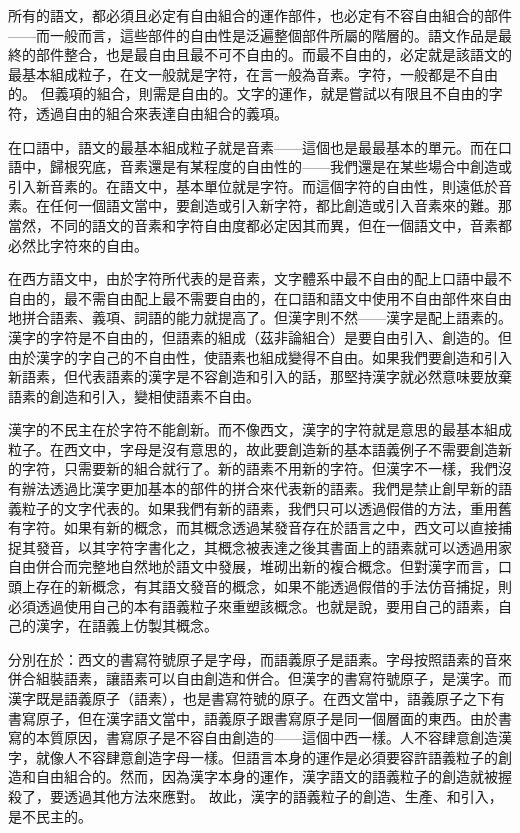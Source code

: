 \documentclass[a5paper, 12pt, openany]{book} %
\begin{document}
所有的語文，都必須且必定有自由組合的運作部件，也必定有不容自由組合的部件——而一般而言，這些部件的自由性是泛遍整個部件所屬的階層的。語文作品是最終的部件整合，也是最自由且最不可不自由的。而最不自由的，必定就是該語文的最基本組成粒子，在文一般就是字符，在言一般為音素。字符，一般都是不自由的。 但義項的組合，則需是自由的。文字的運作，就是嘗試以有限且不自由的字符，透過自由的組合來表達自由組合的義項。

在口語中，語文的最基本組成粒子就是音素——這個也是最最基本的單元。而在口語中，歸根究底，音素還是有某程度的自由性的——我們還是在某些場合中創造或引入新音素的。在語文中，基本單位就是字符。而這個字符的自由性，則遠低於音素。在任何一個語文當中，要創造或引入新字符，都比創造或引入音素來的難。那當然，不同的語文的音素和字符自由度都必定因其而異，但在一個語文中，音素都必然比字符來的自由。

在西方語文中，由於字符所代表的是音素，文字體系中最不自由的配上口語中最不自由的，最不需自由配上最不需要自由的，在口語和語文中使用不自由部件來自由地拼合語素、義項、詞語的能力就提高了。但漢字則不然——漢字是配上語素的。漢字的字符是不自由的，但語素的組成（茲非論組合）是要自由引入、創造的。但由於漢字的字自己的不自由性，使語素也組成變得不自由。如果我們要創造和引入新語素，但代表語素的漢字是不容創造和引入的話，那堅持漢字就必然意味要放棄語素的創造和引入，變相使語素不自由。

漢字的不民主在於字符不能創新。而不像西文，漢字的字符就是意思的最基本組成粒子。在西文中，字母是沒有意思的，故此要創造新的基本語義例子不需要創造新的字符，只需要新的組合就行了。新的語素不用新的字符。但漢字不一樣，我們沒有辦法透過比漢字更加基本的部件的拼合來代表新的語素。我們是禁止創早新的語義粒子的文字代表的。如果我們有新的語素，我們只可以透過假借的方法，重用舊有字符。如果有新的概念，而其概念透過某發音存在於語言之中，西文可以直接捕捉其發音，以其字符字書化之，其概念被表達之後其書面上的語素就可以透過用家自由併合而完整地自然地於語文中發展，堆砌出新的複合概念。但對漢字而言，口頭上存在的新概念，有其語文發音的概念，如果不能透過假借的手法仿音捕捉，則必須透過使用自己的本有語義粒子來重塑該概念。也就是說，要用自己的語素，自己的漢字，在語義上仿製其概念。

分別在於：西文的書寫符號原子是字母，而語義原子是語素。字母按照語素的音來併合組裝語素，讓語素可以自由創造和併合。但漢字的書寫符號原子，是漢字。而漢字既是語義原子（語素），也是書寫符號的原子。在西文當中，語義原子之下有書寫原子，但在漢字語文當中，語義原子跟書寫原子是同一個層面的東西。由於書寫的本質原因，書寫原子是不容自由創造的——這個中西一樣。人不容肆意創造漢字，就像人不容肆意創造字母一樣。但語言本身的運作是必須要容許語義粒子的創造和自由組合的。然而，因為漢字本身的運作，漢字語文的語義粒子的創造就被握殺了，要透過其他方法來應對。 故此，漢字的語義粒子的創造、生產、和引入，是不民主的。
\end{document}
